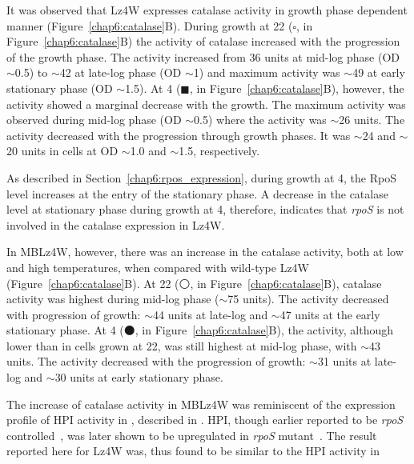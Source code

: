 It was observed that Lz4W expresses catalase activity in growth
phase dependent manner (Figure~\ref{chap6:catalase}B)\@. During
growth at 22\dg{} ($\square$, in Figure~\ref{chap6:catalase}B) the
activity of catalase increased with the progression of the growth
phase. The activity increased from 36 units at mid-log phase
(OD $\sim$0.5) to $\sim$42 at late-log phase (OD
$\sim$1) and maximum activity was $\sim$49 at early stationary
phase (OD $\sim$1.5). At 4\dg{} ($\blacksquare$, in
Figure~\ref{chap6:catalase}B), however, the activity showed a
marginal decrease with the growth. The maximum activity was
observed during mid-log phase (OD $\sim$0.5) where the
activity was $\sim$26 units. The activity decreased with the
progression through growth phases. It was $\sim$24 and $\sim$20
units in cells at OD $\sim$1.0 and $\sim$1.5,
respectively.

As described in Section~\ref{chap6:rpos_expression}, during growth
at 4\dg{}, the RpoS level increases at the entry of the stationary
phase. A decrease in the catalase level at stationary phase during
growth at 4\dg{}, therefore, indicates that \emph{rpoS} is not
involved in the catalase expression in Lz4W.

In MBLz4W, however, there was an increase in the catalase
activity, both at low and high temperatures, when compared with
wild-type Lz4W (Figure~\ref{chap6:catalase}B)\@. At 22\dg{}
($\medcirc$, in Figure~\ref{chap6:catalase}B), catalase activity
was highest during mid-log phase ($\sim$75 units). The activity
decreased with progression of growth: $\sim$44 units at late-log
and $\sim$47 units at the early stationary phase. At 4\dg{}
($\medbullet$, in Figure~\ref{chap6:catalase}B), the activity,
although lower than in cells grown at 22\dg{}, was still highest
at mid-log phase, with $\sim$43 units. The activity decreased with
the progression of growth: $\sim$31 units at late-log and $\sim$30
units at early stationary phase.

The increase of catalase activity in MBLz4W was reminiscent of the
expression profile of HPI activity in , described in
\citet{Visick1997}. HPI, though earlier reported to be \emph{rpoS}
controlled~\citep{Ivanova1994}, was later shown to be upregulated
in \emph{rpoS} mutant~\citep{Visick1997}. The result reported here
for  Lz4W was, thus found to be similar to the HPI
activity in 

